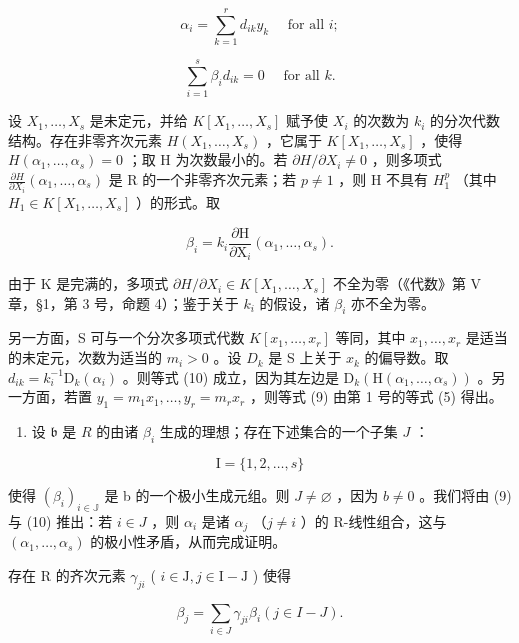 \[
\alpha_ {i} = \sum_ {k = 1} ^ {r} d _ {i k} y _ {k} \quad \text { for   all } i;\tag{9}
\]

\[
\sum_ {i = 1} ^ {s} \beta_ {i} d _ {i k} = 0 \quad \text { for   all } k.\tag{10}
\]

设 \(X_{1},\ldots,X_{s}\) 是未定元，并给 \(K[X_{1},\ldots,X_{s}]\) 赋予使 \(X_{i}\) 的次数为 \(k_{i}\) 的分次代数结构。存在非零齐次元素 \(H(X_{1},\ldots,X_{s})\) ，它属于 \(K[X_{1},\ldots,X_{s}]\) ，使得 \(H(\alpha_{1},\ldots,\alpha_{s})=0\) ；取 H 为次数最小的。若 \(\partial H/\partial X_{i}\neq0\) ，则多项式 \(\frac{\partial H}{\partial X_{i}}(\alpha_{1},\ldots,\alpha_{s})\) 是 R 的一个非零齐次元素；若 \(p\neq1\) ，则 H 不具有 \(H_{1}^{p}\) （其中 \(H_{1}\in K[X_{1},\ldots,X_{s}]\) ）的形式。取

\[
\beta_ {i} = k _ {i} \frac {\partial \mathrm{H}}{\partial \mathrm{X} _ {i}} (\alpha_ {1}, \dots , \alpha_ {s}).
\]

由于 K 是完满的，多项式 \(\partial H/\partial X_{i} \in K[X_{1},\ldots,X_{s}]\) 不全为零（《代数》第 V 章，§1，第 3 号，命题 4）；鉴于关于 \(k_{i}\) 的假设，诸 \(\beta_{i}\) 亦不全为零。

另一方面，S 可与一个分次多项式代数 \(K[x_{1},\ldots,x_{r}]\) 等同，其中 \(x_{1},\ldots,x_{r}\) 是适当的未定元，次数为适当的 \(m_{i}>0\) 。设 \(D_{k}\) 是 S 上关于 \(x_{k}\) 的偏导数。取 \(d_{ik} = k_i^{-1}\mathrm{D}_k(\alpha_i)\) 。则等式 (10) 成立，因为其左边是 \(\mathrm{D}_k(\mathrm{H}(\alpha_1,\dots ,\alpha_s))\) 。另一方面，若置 \(y_{1} = m_{1}x_{1},\ldots ,y_{r} = m_{r}x_{r}\) ，则等式 (9) 由第 1 号的等式 (5) 得出。

\begin{enumerate}
\def\labelenumi{\arabic{enumi})}
\setcounter{enumi}{1}
\tightlist
\item
  设 \(\mathfrak{b}\) 是 \(R\) 的由诸 \(\beta_{i}\) 生成的理想；存在下述集合的一个子集 \(J\) ：
\end{enumerate}

\[
\mathrm{I} = \{1, 2, \dots , s \}
\]

使得 \((\beta_{i})_{i\in\mathbb{J}}\) 是 b 的一个极小生成元组。则 \(J\neq\varnothing\) ，因为 \(b\neq0\) 。我们将由 (9) 与 (10) 推出：若 \(i\in J\) ，则 \(\alpha_{i}\) 是诸 \(\alpha_{j}\) （\(j\neq i\) ）的 R-线性组合，这与 \((\alpha_{1},\ldots,\alpha_{s})\) 的极小性矛盾，从而完成证明。

存在 R 的齐次元素 \(\gamma_{ji}\) ( \(i \in \mathrm{J}, j \in \mathrm{I} - \mathrm{J}\) ) 使得

\[
\beta_ {j} = \sum_ {i \in J} \gamma_ {j i} \beta_ {i} (j \in I - J).\tag{11}
\]

